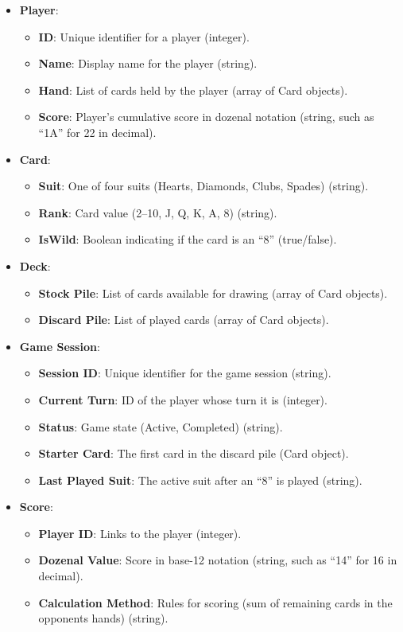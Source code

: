 \documentclass[12pt]{article}
\begin{document}
\begin{itemize}
    \item \textbf{Player}:
    \begin{itemize}
        \item \textbf{ID}: Unique identifier for a player (integer).
        \item \textbf{Name}: Display name for the player (string).
        \item \textbf{Hand}: List of cards held by the player (array of Card objects).
        \item \textbf{Score}: Player's cumulative score in dozenal notation (string, such as ``1A'' for 22 in decimal).
    \end{itemize}
    \item \textbf{Card}:
    \begin{itemize}
        \item \textbf{Suit}: One of four suits (Hearts, Diamonds, Clubs, Spades) (string).
        \item \textbf{Rank}: Card value (2--10, J, Q, K, A, 8) (string).
        \item \textbf{IsWild}: Boolean indicating if the card is an ``8'' (true/false).
    \end{itemize}
    \item \textbf{Deck}:
    \begin{itemize}
        \item \textbf{Stock Pile}: List of cards available for drawing (array of Card objects).
        \item \textbf{Discard Pile}: List of played cards (array of Card objects).
    \end{itemize}
    \item \textbf{Game Session}:
    \begin{itemize}
        \item \textbf{Session ID}: Unique identifier for the game session (string).
        \item \textbf{Current Turn}: ID of the player whose turn it is (integer).
        \item \textbf{Status}: Game state (Active, Completed) (string).
        \item \textbf{Starter Card}: The first card in the discard pile (Card object).
        \item \textbf{Last Played Suit}: The active suit after an ``8'' is played (string).
    \end{itemize}
    \item \textbf{Score}:
    \begin{itemize}
        \item \textbf{Player ID}: Links to the player (integer).
        \item \textbf{Dozenal Value}: Score in base-12 notation (string, such as ``14'' for 16 in decimal).
        \item \textbf{Calculation Method}: Rules for scoring (sum of remaining cards in the opponents hands) (string).
    \end{itemize}
\end{itemize}
\end{document}
